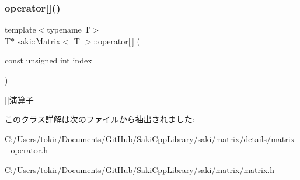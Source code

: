 \mbox{\label{classsaki_1_1_matrix_ad1fa9ab13d6ab9def73a4ac5bfa15cf4}} 
\subsubsection{\texorpdfstring{operator[]()}{operator[]()}}
{\footnotesize\ttfamily template$<$typename T$>$ \\
T$\ast$ \mbox{\hyperlink{classsaki_1_1_matrix}{saki\+::\+Matrix}}$<$ T $>$\+::operator\mbox{[}$\,$\mbox{]} (\begin{DoxyParamCaption}\item[{const unsigned int}]{index }\end{DoxyParamCaption})\hspace{0.3cm}{\ttfamily [inline]}}



\mbox{[}\mbox{]}演算子 



このクラス詳解は次のファイルから抽出されました\+:\begin{DoxyCompactItemize}
\item 
C\+:/\+Users/tokir/\+Documents/\+Git\+Hub/\+Saki\+Cpp\+Library/saki/matrix/details/\mbox{\hyperlink{matrix__operator_8h}{matrix\+\_\+operator.\+h}}\item 
C\+:/\+Users/tokir/\+Documents/\+Git\+Hub/\+Saki\+Cpp\+Library/saki/matrix/\mbox{\hyperlink{matrix_8h}{matrix.\+h}}\end{DoxyCompactItemize}
